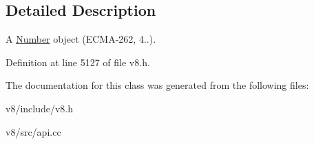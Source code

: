 \subsection{Detailed Description}
A \mbox{\hyperlink{classv8_1_1Number}{Number}} object (E\+C\+M\+A-\/262, 4..). 

Definition at line 5127 of file v8.\+h.



The documentation for this class was generated from the following files\+:\begin{DoxyCompactItemize}
\item 
v8/include/v8.\+h\item 
v8/src/api.\+cc\end{DoxyCompactItemize}
